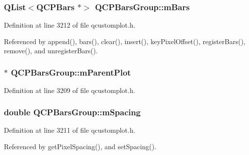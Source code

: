 \subsubsection[{m\+Bars}]{\setlength{\rightskip}{0pt plus 5cm}Q\+List$<${\bf Q\+C\+P\+Bars} $\ast$$>$ Q\+C\+P\+Bars\+Group\+::m\+Bars\hspace{0.3cm}{\ttfamily [protected]}}\label{class_q_c_p_bars_group_aa5affa0639c13e05bda9d23f16dd1393}


Definition at line 3212 of file qcustomplot.\+h.



Referenced by append(), bars(), clear(), insert(), key\+Pixel\+Offset(), register\+Bars(), remove(), and unregister\+Bars().

\hypertarget{class_q_c_p_bars_group_a973d408cfbf88db95115aec71877f9e7}{}
\subsubsection[{m\+Parent\+Plot}]{$\ast$ Q\+C\+P\+Bars\+Group\+::m\+Parent\+Plot\hspace{0.3cm}{\ttfamily [protected]}}\label{class_q_c_p_bars_group_a973d408cfbf88db95115aec71877f9e7}


Definition at line 3209 of file qcustomplot.\+h.

\hypertarget{class_q_c_p_bars_group_a56471d7f548ca6141b7a5bf9629f7ece}{}
\subsubsection[{m\+Spacing}]{\setlength{\rightskip}{0pt plus 5cm}double Q\+C\+P\+Bars\+Group\+::m\+Spacing\hspace{0.3cm}{\ttfamily [protected]}}\label{class_q_c_p_bars_group_a56471d7f548ca6141b7a5bf9629f7ece}


Definition at line 3211 of file qcustomplot.\+h.



Referenced by get\+Pixel\+Spacing(), and set\+Spacing().

\hypertarget{class_q_c_p_bars_group_a6794ee1a9c81864d627bff6a4b2d64ec}{}
